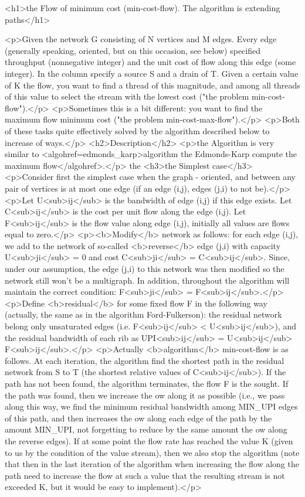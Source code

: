 <h1>the Flow of minimum cost (min-cost-flow). The algorithm is extending paths</h1>

<p>Given the network G consisting of N vertices and M edges. Every edge (generally speaking, oriented, but on this occasion, see below) specified throughput (nonnegative integer) and the unit cost of flow along this edge (some integer). In the column specify a source S and a drain of T. Given a certain value of K the flow, you want to find a thread of this magnitude, and among all threads of this value to select the stream with the lowest cost ("the problem min-cost-flow").</p>
<p>Sometimes this is a bit different: you want to find the maximum flow minimum cost ("the problem min-cost-max-flow").</p>
<p>Both of these tasks quite effectively solved by the algorithm described below to increase of ways.</p>
<h2>Description</h2>
<p>the Algorithm is very similar to <algohref=edmonds_karp>algorithm the Edmonds-Karp compute the maximum flow</algohref>.</p>
the <h3>the Simplest case</h3>
<p>Consider first the simplest case when the graph - oriented, and between any pair of vertices is at most one edge (if an edge (i,j), edges (j,i) to not be).</p>
<p>Let U<sub>ij</sub> is the bandwidth of edge (i,j) if this edge exists. Let C<sub>ij</sub> is the cost per unit flow along the edge (i,j). Let F<sub>ij</sub> is the flow value along edge (i,j), initially all values are flows equal to zero.</p>
<p><b>Modify</b> network as follows: for each edge (i,j), we add to the network of so-called <b>reverse</b> edge (j,i) with capacity U<sub>ji</sub> = 0 and cost C<sub>ji</sub> = C<sub>ij</sub>. Since, under our assumption, the edge (j,i) to this network was then modified so the network still won't be a multigraph. In addition, throughout the algorithm will maintain the correct condition: F<sub>ji</sub> = F<sub>ij</sub>.</p>
<p>Define <b>residual</b> for some fixed flow F in the following way (actually, the same as in the algorithm Ford-Fulkerson): the residual network belong only unsaturated edges (i.e. F<sub>ij</sub> < U<sub>ij</sub>), and the residual bandwidth of each rib as UPI<sub>ij</sub> = U<sub>ij</sub> F<sub>ij</sub>.</p>
<p>Actually <b>algorithm</b> min-cost-flow is as follows. At each iteration, the algorithm find the shortest path in the residual network from S to T (the shortest relative values of C<sub>ij</sub>). If the path has not been found, the algorithm terminates, the flow F is the sought. If the path was found, then we increase the ow along it as possible (i.e., we pass along this way, we find the minimum residual bandwidth among MIN_UPI edges of this path, and then increases the ow along each edge of the path by the amount MIN_UPI, not forgetting to reduce by the same amount the ow along the reverse edges). If at some point the flow rate has reached the value K (given to us by the condition of the value stream), then we also stop the algorithm (note that then in the last iteration of the algorithm when increasing the flow along the path need to increase the flow at such a value that the resulting stream is not exceeded K, but it would be easy to implement).</p>
